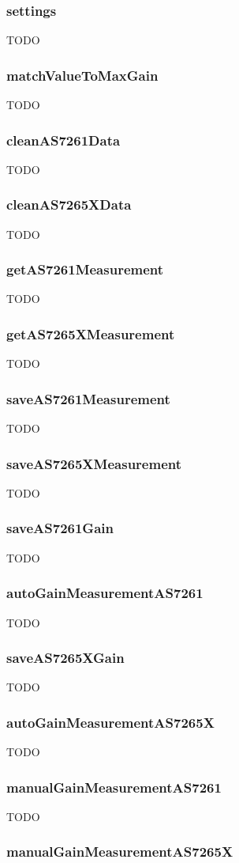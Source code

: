 \subsubsection{settings}
TODO
\subsubsection{matchValueToMaxGain}
TODO
\subsubsection{cleanAS7261Data}
TODO
\subsubsection{cleanAS7265XData}
TODO
\subsubsection{getAS7261Measurement}
TODO
\subsubsection{getAS7265XMeasurement}
TODO
\subsubsection{saveAS7261Measurement}
TODO
\subsubsection{saveAS7265XMeasurement}
TODO
\subsubsection{saveAS7261Gain}
TODO
\subsubsection{autoGainMeasurementAS7261}
TODO
\subsubsection{saveAS7265XGain}
TODO
\subsubsection{autoGainMeasurementAS7265X}
TODO
\subsubsection{manualGainMeasurementAS7261}
TODO
\subsubsection{manualGainMeasurementAS7265X}
